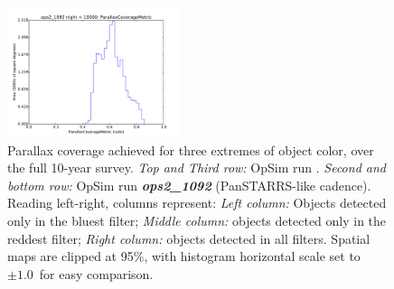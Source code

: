 \begin{figure}[ht]
\begin{center}
  \includegraphics[width=2.0in]{./figs/milkyway/MW_Astrom_paCovge_1092_10y_hst.pdf}
  \end{center}
  \caption{Parallax coverage achieved for three extremes of object color, over the full 10-year survey. {\it Top and Third row:} OpSim run . {\it Second and bottom row:} OpSim run {\it \bf ops2\_1092} (PanSTARRS-like cadence). Reading left-right, columns represent: {\it Left column:} Objects detected only in the bluest filter; {\it Middle column:} objects detected only in the reddest filter; {\it Right column:} objects detected in all filters. Spatial maps are clipped at 95\%, with histogram horizontal scale set to $\pm 1.0$~for easy comparison.}
  \label{fig_astrom_ByFilter_PACoverage}
\end{figure}

